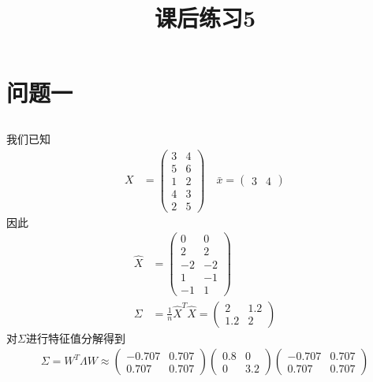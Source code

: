 \documentclass[12pt, a4paper]{article}
\title{课后练习5}
\author{}
\date{}
\begin{document}
\maketitle %

\section{问题一}

\subsection{}

我们已知
\begin{align*}
    X&=\begin{pmatrix}
        3&4\\5&6\\1&2\\4&3\\2&5
    \end{pmatrix}\quad
    \bar{x}=\begin{pmatrix}
        3&4
    \end{pmatrix}
\end{align*}
因此
\begin{align*}
    \hat{X}&=\begin{pmatrix}
        0&0\\2&2\\-2&-2\\1&-1\\-1&1
    \end{pmatrix}\\
    \Sigma&=\frac{1}{n}\hat{X}^T\hat{X}=\begin{pmatrix}
        2&1.2\\1.2&2
    \end{pmatrix}
\end{align*}
对$\Sigma$进行特征值分解得到
\begin{align*}
    \Sigma = W^T \Lambda W \approx 
    \begin{pmatrix}
        -0.707&0.707\\0.707&0.707
    \end{pmatrix}
    \begin{pmatrix}
        0.8&0\\0&3.2
    \end{pmatrix}
    \begin{pmatrix}
        -0.707&0.707\\0.707&0.707
    \end{pmatrix}
\end{align*}
\end{document}
